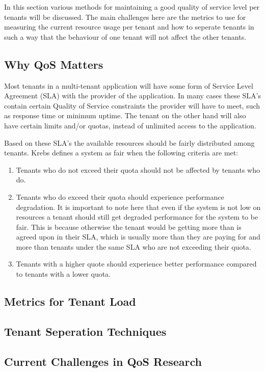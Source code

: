 In this section various methods for maintaining a good quality of service level per tenants will be discussed.
The main challenges here are the metrics to use for measuring the current resource usage per tenant and how to seperate tenants in such a way that the behaviour of one tenant will not affect the other tenants.\cite{krebs2013metrics}

\subsection{Why QoS Matters}
Most tenants in a multi-tenant application will have some form of Service Level Agreement (SLA) with the provider of the application.
In many cases these SLA's contain certain Quality of Service constraints the provider will have to meet, such as response time or minimum uptime. 
The tenant on the other hand will also have certain limits and/or quotas, instead of unlimited access to the application.

Based on these SLA's the available resources should be fairly distributed among tenants.
Krebs\cite{krebs2013metrics} defines a system as fair when the following criteria are met:
\begin{enumerate}
	\item Tenants who do not exceed their quota should not be affected by tenants who do.
	\item Tenants who do exceed their quota should experience performance degradation. 
		It is important to note here that even if the system is not low on resources a tenant should still get degraded performance for the system to be fair.
		This is because otherwise the tenant would be getting more than is agreed upon in their SLA, which is usually more than they are paying for and more than tenants under the same SLA who are not exceeding their quota.
	\item Tenants with a higher quote should experience better performance compared to tenants with a lower quota.
\end{enumerate}

\subsection{Metrics for Tenant Load}

\subsection{Tenant Seperation Techniques}

\subsection{Current Challenges in QoS Research}
